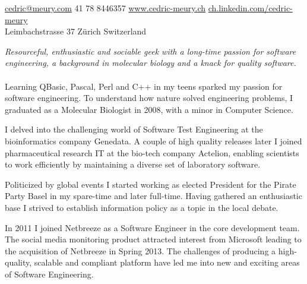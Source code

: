 \documentclass[10pt,a4paper]{article}
\begin{document}
\sloppy  %


\nobreakvspace{0.3em}  %

\noindent\href{mailto:cedric@meury.com}{cedric@meury.com}\sbull
\textsmaller{+}41 78 8446357\sbull
\href{http://www.cedric-meury.ch/}{www.cedric-meury.ch}\sbull
\href{http://ch.linkedin.com/pub/cedric-meury/29/65/b96/}{ch.linkedin.com/cedric-meury}
\\
Leimbachstrasse 37 Z\"urich\sbull
Switzerland

\spacedhrule{0.9em}{-0.4em}  %


\vspace{-1.3em}  
\begin{multicols}{2}  %
\noindent \emph{Resourceful, enthusiastic and sociable geek with a long-time passion for software engineering, a background in molecular biology and a knack for quality software.}
\\
\\
Learning QBasic, Pascal, Perl and C++ in my teens sparked my passion for software engineering. To understand how nature solved engineering problems, I graduated as a Molecular Biologist in 2008, with a minor in Computer Science.

I delved into the challenging world of Software Test Engineering at the bioinformatics company Genedata. A couple of high quality releases later I joined pharmaceutical research IT at the bio-tech company Actelion, enabling scientists to work efficiently by maintaining a diverse set of laboratory software. 

Politicized by global events I started working as elected President for the Pirate Party Basel in my spare-time and later full-time. Having gathered an enthusiastic base I strived to establish information policy as a topic in the local debate.

In 2011 I joined Netbreeze as a Software Engineer in the core development team. The social media monitoring product attracted interest from Microsoft leading to the acquisition of Netbreeze in Spring 2013. The challenges of producing a high-quality, scalable and compliant platform have led me into new and exciting areas of Software Engineering.
\end{multicols}
\end{document}
